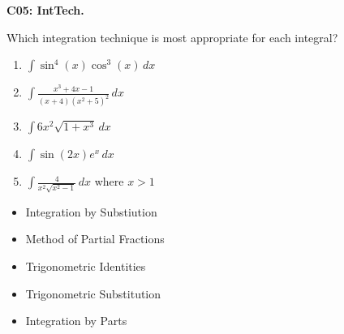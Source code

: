 \documentclass[12pt]{article}
\newcommand{\<}{\left\langle}
\renewcommand{\>}{\right\rangle}
\newcommand{\exerciseHeader}[4]{


  \vspace{0.5em}
  \textbf{#2}
  \vspace{0.5em}

}
\begin{document}
\begin{multicols}{2}
%
%
%

\columnbreak

\exerciseHeader{2017 June 21}{C05: IntTech. }{
Identify appropriate integration techniques.
}{4/4}

Which integration technique is most appropriate for each integral?

  \begin{enumerate}
    \item \(\int\sin^4(x)\cos^3(x)\,dx\)
    \item \(\int\frac{x^3+4x-1}{(x+4)(x^2+5)^2}\,dx\)
    \item \(\int 6x^2\sqrt{1+x^3}\,dx\)
    \item \(\int \sin(2x)e^x\,dx\)
    \item \(\int\frac{4}{x^2\sqrt{x^2-1}}\,dx\) where \(x>1\)
  \end{enumerate}
  \begin{itemize}\footnotesize
    \item Integration by Substiution
    \item Method of Partial Fractions
    \item Trigonometric Identities
    \item Trigonometric Substitution
    \item Integration by Parts
  \end{itemize}




\end{multicols}
\end{document}
